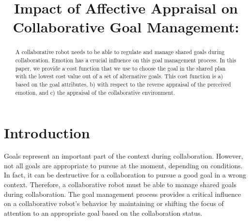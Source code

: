 \documentclass[conference]{IEEEtran}
\begin{document}
\title{{\fontsize{19}{20}\selectfont Impact of Affective Appraisal
on Collaborative Goal Management:}\\ \vspace*{-3.5mm}}

 \author{ 
 \vspace*{-9mm}}


\maketitle

\begin{abstract}
A collaborative robot needs to be able to regulate and manage shared goals
during collaboration. Emotion has a crucial influence on this goal management
process. In this paper, we provide a cost function that we use to choose the
goal in the shared plan with the lowest cost value out of a set of alternative
goals. This cost function is a) based on the goal attributes, b) with respect to
the reverse appraisal of the perceived emotion, and c) the appraisal of the
collaborative environment.
\end{abstract}

\IEEEpeerreviewmaketitle
\vspace*{-2mm}
\section{Introduction}
\vspace*{-2mm}
Goals represent an important part of the context during collaboration. However,
not all goals are appropriate to pursue at the moment, depending on conditions.
In fact, it can be destructive for a collaboration to pursue a good goal in a
wrong context. Therefore, a collaborative robot must be able to manage shared
goals during collaboration. The goal management process provides a critical
influence on a collaborative robot's behavior by maintaining or shifting the
focus of attention to an appropriate goal based on the collaboration status.
\end{document}
